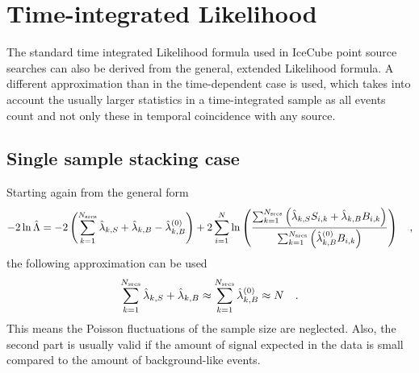\section{Time-integrated Likelihood}
  \label{chp:pointsource_time_int_llh}
The standard time integrated Likelihood formula used in IceCube point source searches can also be derived from the general, extended Likelihood formula.
A different approximation than in the time-dependent case is used, which takes into account the usually larger statistics in a time-integrated sample as all events count and not only these in temporal coincidence with any source.

\subsection{Single sample stacking case}
Starting again from the general form
\begin{equation}
  -2\ln\hat{\Lambda}
  = -2\left(\sum_{k=1}^{N_\text{srcs}}\hat{\lambda}_{k,S} +
                                      \hat{\lambda}_{k,B} -
                                      \hat{\lambda}_{k,B}^{(0)}\right) +
    2\sum_{i=1}^N \ln\left(
      \frac{\sum_{k=1}^{N_\text{srcs}}\left(
          \hat{\lambda}_{k,S} S_{i,k}+\hat{\lambda}_{k,B} B_{i,k}\right)}
          {\sum_{k=1}^{N_\text{srcs}}\left(
            \hat{\lambda}_{k,B}^{(0)} B_{i,k}
          \right)}
        \right)
  \quad\text{,}
\end{equation}
the following approximation can be used
\begin{equation}
  \label{equ:time_indep_fixed_expectation}
  \sum_{k=1}^{N_\text{srcs}} \hat{\lambda}_{k,S} + \hat{\lambda}_{k,B} \approx
    \sum_{k=1}^{N_\text{srcs}} \hat{\lambda}_{k,B}^{(0)} \approx N
  \quad\text{.}
\end{equation}
This means the Poisson fluctuations of the sample size are neglected.
Also, the second part is usually valid if the amount of signal expected in the data is small compared to the amount of background-like events.

